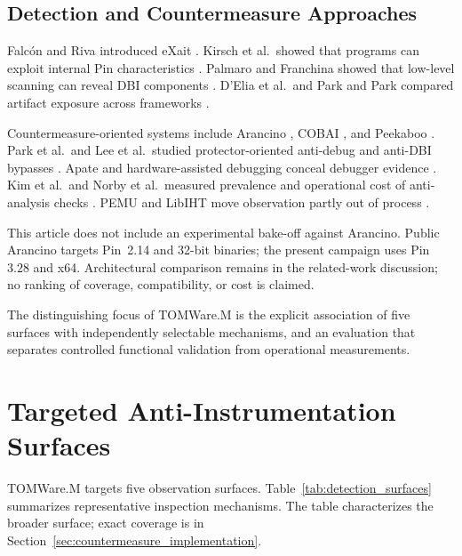 \documentclass[pdflatex,sn-mathphys-num]{sn-jnl}
\theoremstyle{thmstyleone}
\theoremstyle{thmstyletwo}
\theoremstyle{thmstylethree}
\begin{document}
\subsection{Detection and Countermeasure Approaches}

Falc\'{o}n and Riva introduced eXait \cite{falcon2012dynamic}. Kirsch et al.\ showed that programs can exploit internal Pin characteristics \cite{kirsch2018pwin}. Palmaro and Franchina showed that low-level scanning can reveal DBI components \cite{palmaro2021memory}. D'Elia et al.\ and Park and Park compared artifact exposure across frameworks \cite{delia2022evaluating,park2024detection}.

Countermeasure-oriented systems include Arancino \cite{polino2017measuring}, COBAI \cite{craciun2023cobai}, and Peekaboo \cite{gaber2025peekaboo}. Park et al.\ and Lee et al.\ studied protector-oriented anti-debug and anti-DBI bypasses \cite{park2019antidebug,lee2021bypassing}. Apate and hardware-assisted debugging conceal debugger evidence \cite{shi2017apate,zhang2018transparent}. Kim et al.\ and Norby et al.\ measured prevalence and operational cost of anti-analysis checks \cite{kim2022large,norby2025measurement}. PEMU and LibIHT move observation partly out of process \cite{zeng2015pemu,zhao2025libiht}.

This article does not include an experimental bake-off against Arancino. Public Arancino targets Pin~2.14 and 32-bit binaries; the present campaign uses Pin~$3.28$ and x64. Architectural comparison remains in the related-work discussion; no ranking of coverage, compatibility, or cost is claimed.

The distinguishing focus of TOMWare.M is the explicit association of five surfaces with independently selectable mechanisms, and an evaluation that separates controlled functional validation from operational measurements.

\section{Targeted Anti-Instrumentation Surfaces}
\label{sec:evasive_techniques}

TOMWare.M targets five observation surfaces. Table~\ref{tab:detection_surfaces} summarizes representative inspection mechanisms. The table characterizes the broader surface; exact coverage is in Section~\ref{sec:countermeasure_implementation}.
\end{document}
